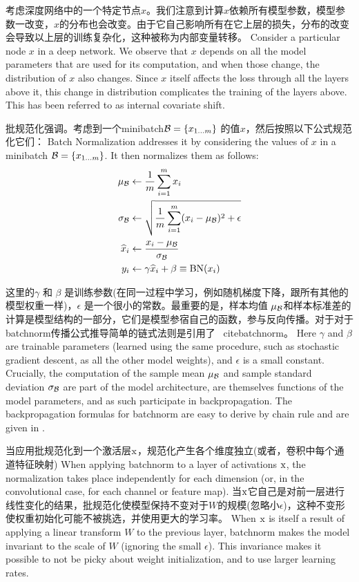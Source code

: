 考虑深度网络中的一个特定节点$x$。我们注意到计算$x$依赖所有模型参数，模型参数一改变，$x$的分布也会改变。由于它自己影响所有在它上层的损失，分布的改变会导致以上层的训练复杂化，这种被称为内部变量转移。
Consider a particular node $x$ in a deep network. We observe that $x$ depends on all the model parameters that are used for its computation, and when those change, the distribution of $x$ also changes. Since $x$ itself affects the loss through all the layers above it, this change in distribution complicates the training of the layers above. This has been referred to as internal covariate shift.

批规范化强调。考虑到一个minibatch$\mathcal{B}=\{x_{1\ldots m}\}$ 的值$x$，然后按照以下公式规范化它们：
Batch Normalization \cite{batchnorm} addresses it by considering the values of $x$ in a minibatch $\mathcal{B}=\{x_{1\ldots m}\}$. It then normalizes them as follows:
\begin{align*}
    \mu_{\mathcal{B}} &\leftarrow \frac{1}{m}\sum_{i=1}^m x_i\\
  \sigma_{\mathcal{B}} &\leftarrow  \sqrt{\frac{1}{m}\sum_{i=1}^m (x_i-\mu_{\mathcal{B}})^2+\epsilon}\\
\widehat{x}_i &\leftarrow \frac{x_i-\mu_{\mathcal{B}}}{\sigma_{\mathcal{B}}}
\\
  y_i &\leftarrow \gamma\widehat{x}_i + \beta  \equiv \text{BN}(x_i)
\end{align*}

这里的$\gamma$ 和 $\beta$ 是训练参数(在同一过程中学习，例如随机梯度下降，跟所有其他的模型权重一样)，$\epsilon$ 是一个很小的常数。最重要的是，样本均值 $\mu_{\mathcal{B}}$和样本标准差的计算是模型结构的一部分，它们是模型参宿自己的函数，参与反向传播。对于对于batchnorm传播公式推导简单的链式法则是引用了
\ cite{batchnorm}。
Here $\gamma$ and $\beta$ are trainable parameters (learned using the same procedure, such as stochastic gradient descent, as all the other model weights), and $\epsilon$ is a small constant. Crucially, the computation of the sample mean $\mu_{\mathcal{B}}$ and sample standard deviation $\sigma_{\mathcal{B}}$ are part of the model architecture, are themselves functions of the model parameters, and as such participate in backpropagation. The backpropagation formulas for batchnorm are easy to derive by chain rule and are given in \cite{batchnorm}.

当应用批规范化到一个激活层$\mathrm{x}$，规范化产生各个维度独立(或者，卷积中每个通道特征映射)
When applying batchnorm to a layer of activations $\mathrm{x}$, the normalization takes place independently for each dimension (or, in the convolutional case, for each channel or feature map).
当$\mathrm{x}$它自己是对前一层进行线性变化的结果，批规范化使模型保持不变对于$W$的规模(忽略小$\epsilon$)，这种不变形使权重初始化可能不被挑选，并使用更大的学习率。
When $\mathrm{x}$ is itself a result of applying a linear transform $W$ to the previous layer, batchnorm makes the model invariant to the scale of $W$ (ignoring the small $\epsilon$). This invariance makes it possible to not be picky about weight initialization, and to use larger learning rates.

